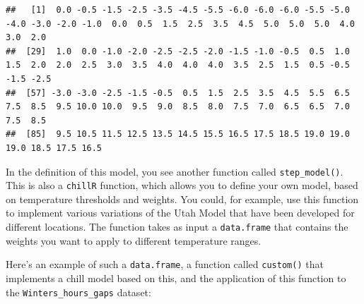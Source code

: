 \documentclass[
]{book}
\newenvironment{Shaded}{\begin{snugshade}}{\end{snugshade}}
\newcommand{\DataTypeTok}[1]{\textcolor[rgb]{0.13,0.29,0.53}{#1}}
\newcommand{\DecValTok}[1]{\textcolor[rgb]{0.00,0.00,0.81}{#1}}
\newcommand{\KeywordTok}[1]{\textcolor[rgb]{0.13,0.29,0.53}{\textbf{#1}}}
\newcommand{\NormalTok}[1]{#1}
\newcommand{\OperatorTok}[1]{\textcolor[rgb]{0.81,0.36,0.00}{\textbf{#1}}}
\newcommand{\StringTok}[1]{\textcolor[rgb]{0.31,0.60,0.02}{#1}}
\begin{document}
\begin{verbatim}
##   [1]  0.0 -0.5 -1.5 -2.5 -3.5 -4.5 -5.5 -6.0 -6.0 -6.0 -5.5 -5.0 -4.0 -3.0 -2.0 -1.0  0.0  0.5  1.5  2.5  3.5  4.5  5.0  5.0  5.0  4.0  3.0  2.0
##  [29]  1.0  0.0 -1.0 -2.0 -2.5 -2.5 -2.0 -1.5 -1.0 -0.5  0.5  1.0  1.5  2.0  2.0  2.5  3.0  3.5  4.0  4.0  4.0  3.5  2.5  1.5  0.5 -0.5 -1.5 -2.5
##  [57] -3.0 -3.0 -2.5 -1.5 -0.5  0.5  1.5  2.5  3.5  4.5  5.5  6.5  7.5  8.5  9.5 10.0 10.0  9.5  9.0  8.5  8.0  7.5  7.0  6.5  6.5  7.0  7.5  8.5
##  [85]  9.5 10.5 11.5 12.5 13.5 14.5 15.5 16.5 17.5 18.5 19.0 19.0 19.0 18.5 17.5 16.5
\end{verbatim}

In the definition of this model, you see another function called \texttt{step\_model()}. This is also a \texttt{chillR} function, which allows you to define your own model, based on temperature thresholds and weights. You could, for example, use this function to implement various variations of the Utah Model that have been developed for different locations. The function takes as input a \texttt{data.frame} that contains the weights you want to apply to different temperature ranges.

Here's an example of such a \texttt{data.frame}, a function called \texttt{custom()} that implements a chill model based on this, and the application of this function to the \texttt{Winters\_hours\_gaps} dataset:

\begin{Shaded}
\end{Shaded}
\end{document}
